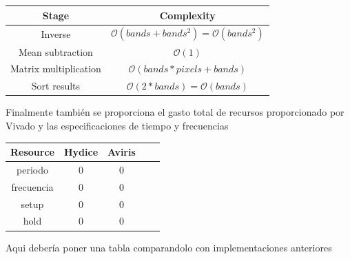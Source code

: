 \begin{center}
 \begin{tabular}{|c|c|} 
 \hline
 Stage & Complexity \\ [0.5ex] 
 \hline\hline
 Inverse & $\mathcal{O}(bands+bands^2) = \mathcal{O}(bands^2)$\\ 
 \hline
 Mean subtraction & $\mathcal{O}(1)$\\
 \hline
 Matrix multiplication & $\mathcal{O}(bands*pixels+bands)$\\
 \hline
 Sort results & $\mathcal{O}(2*bands) = \mathcal{O}(bands)$\\
 \hline
\end{tabular}
\end{center}

Finalmente también se proporciona el gasto total de recursos proporcionado por Vivado y las especificaciones de tiempo y frecuencias

\begin{center}
 \begin{tabular}{|c|c|c|c|c|} 
 \hline
 Resource & Hydice & Aviris\\ [0.5ex] 
 \hline\hline
 periodo & 0 & 0\\ 
 \hline
 frecuencia & 0 & 0\\ 
 \hline
 setup & 0 & 0\\ 
 \hline
 hold & 0 & 0\\ 
 \hline
\end{tabular}
\end{center}

Aqui debería poner una tabla comparandolo con implementaciones anteriores